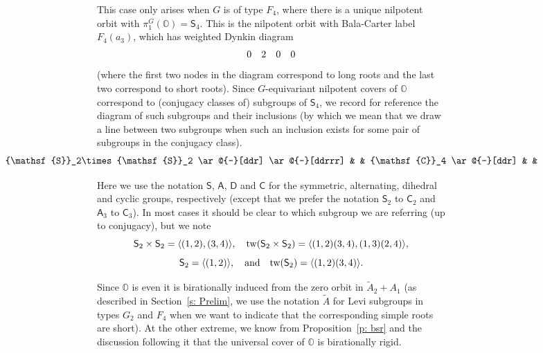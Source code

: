 \documentclass[11pt]{amsart}
\renewcommand{\O}{{\mathbb O}}
\newcommand{\Dih}{{\mathsf{D}}}
\newcommand{\Alt}{{\mathsf{A}}}
\newcommand{\Sym}{{\mathsf{S}}}
\newcommand{\Cyc}{{\mathsf{C}}}
\newcommand{\tw}{{{\mbox{\rm tw}}}}
\numberwithin{equation}{section}
\begin{document}
	This case only arises when $G$ is of type $F_4$, where there is a unique nilpotent orbit with $\pi_1^G(\O)=\Sym_4$. This is the nilpotent orbit with Bala-Carter label $F_4(a_3)$, which has weighted Dynkin diagram 
	$$\begin{array}{c c c c}
		0 & 2 & 0 & 0 \\
	\end{array}$$
	(where the first two nodes in the diagram correspond to long roots and the last two correspond to short roots). Since $G$-equivariant nilpotent covers of $\O$ correspond to (conjugacy classes of) subgroups of $\Sym_4$, we record for reference the diagram of such subgroups and their inclusions (by which we mean that we draw a line between two subgroups when such an inclusion exists for some pair of subgroups in the conjugacy class).
	\begin{eqnarray*}
		\label{e: S4subgps}
		\begin{array}{c} \centerline{\xymatrix{
					& & \Sym_4 \ar@{-}[d] \ar@{-}[dl] \ar@{-}[dr] & &  \\
					& \Sym_3 \ar@{-}[ddd] \ar@{-}[ddr] & \Dih_8 \ar@{-}[dll] \ar@{-}[d] \ar@{-}[drr] & \Alt_4 \ar@{-}[dr] & \\
					\Sym_2\times \Sym_2 \ar@{-}[ddr] \ar@{-}[ddrrr] & & \Cyc_4 \ar@{-}[ddr] & &  \tw(\Sym_2\times\Sym_2) \ar@{-}[ddl] \\
					& & \Alt_3 \ar@{-}[dd] & &  \\
					& \Sym_2 \ar@{-}[dr] & & \tw(\Sym_2) \ar@{-}[dl] &  \\
					& & 1 & & 
		}}\end{array}
	\end{eqnarray*}
	
	Here we use the notation $\Sym$, $\Alt$, $\Dih$ and $\Cyc$ for the symmetric, alternating, dihedral and cyclic groups, respectively (except that we prefer the notation $\Sym_2$ to $\Cyc_2$ and $\Alt_3$ to $\Cyc_3$). In most cases it should be clear to which subgroup we are referring (up to conjugacy), but we note
	$$\Sym_2\times \Sym_2=\langle (1,2),(3,4)\rangle, \quad \tw(\Sym_2\times\Sym_2)=\langle (1,2)(3,4), (1,3)(2,4)\rangle,$$ $$ \Sym_2=\langle (1,2)\rangle, \quad\mbox{and} \quad \tw(\Sym_2)=\langle (1,2)(3,4)\rangle.$$
	
	
	
	Since $\O$ is even it is birationally induced from the zero orbit in $\widetilde{A}_2 + A_1$ (as described in Section~\ref{s: Prelim}, we use the notation $\widetilde{A}$ for Levi subgroups in types $G_2$ and $F_4$ when we want to indicate that the corresponding simple roots are short). At the other extreme, we know from Proposition~\ref{p: bsr} and the discussion following it that the universal cover of $\O$ is birationally rigid. 
	
\end{document}
